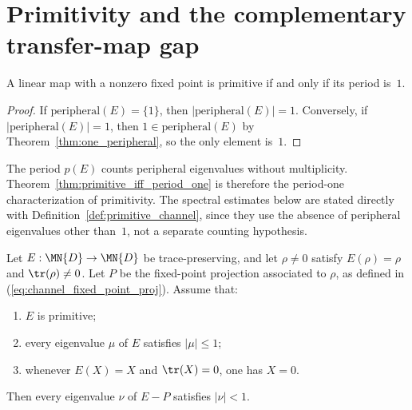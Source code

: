 \section{Primitivity and the complementary transfer-map gap}

\begin{theorem}\label{thm:primitive_iff_period_one}
    \leanok
    A linear map with a nonzero fixed point is primitive if and only if
    its period is~$1$.
\end{theorem}

\begin{proof}\leanok{}
    If $\mathrm{peripheral}(E)=\{1\}$, then
    $|\mathrm{peripheral}(E)|=1$.
    Conversely, if $|\mathrm{peripheral}(E)|=1$, then
    $1\in\mathrm{peripheral}(E)$ by
    Theorem~\ref{thm:one_peripheral}, so the only element is~$1$.
\end{proof}

\begin{remark}%
    \label{rem:primitive_period_one_characterization}
    \leanok
    The period $p(E)$ counts peripheral eigenvalues without multiplicity.
    Theorem~\ref{thm:primitive_iff_period_one} is therefore the period-one
    characterization of primitivity. The spectral estimates below are stated
    directly with Definition~\ref{def:primitive_channel}, since they use the
    absence of peripheral eigenvalues other than~$1$, not a separate counting
    hypothesis.
\end{remark}

\begin{theorem}%
    \label{thm:primitive_compl_lt_one}
    \leanok
    Let $E:\MN{D}\to\MN{D}$ be trace-preserving, and let
    $\rho\neq0$ satisfy $E(\rho)=\rho$ and $\tr(\rho)\neq0$.
    Let $P$ be the fixed-point projection associated to $\rho$, as defined
    in (\ref{eq:channel_fixed_point_proj}). Assume that:
    \begin{enumerate}
        \item $E$ is primitive;
        \item every eigenvalue $\mu$ of $E$ satisfies $|\mu|\le1$;
        \item whenever $E(X)=X$ and $\tr(X)=0$, one has $X=0$.
    \end{enumerate}
    Then every eigenvalue $\nu$ of $E-P$ satisfies $|\nu|<1$.
\end{theorem}

